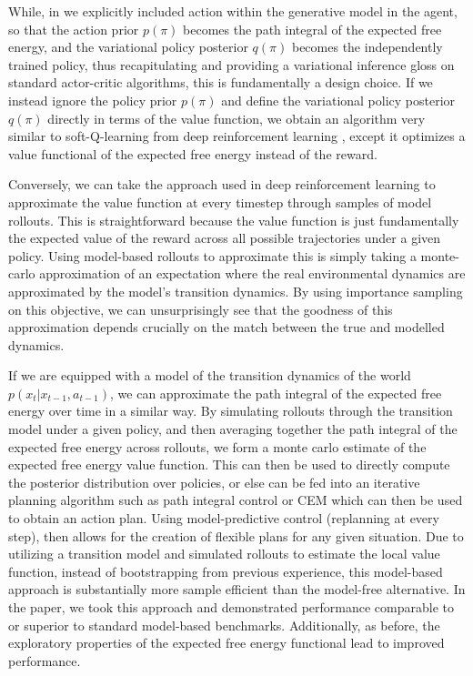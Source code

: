 While, in \citet{millidge_deep_2019} we explicitly included action within the generative model in the agent, so that the action prior $p(\pi)$ becomes the path integral of the expected free energy, and the variational policy posterior $q(\pi)$ becomes the independently trained policy, thus recapitulating and providing a variational inference gloss on standard actor-critic algorithms, this is fundamentally a design choice. If we instead ignore the policy prior $p(\pi)$ and define the variational policy posterior $q(\pi)$ directly in terms of the value function, we obtain an algorithm very similar to soft-Q-learning from deep reinforcement learning \citep{haarnoja2018soft}, except it optimizes a value functional of the expected free energy instead of the reward.

Conversely, we can take the approach used in deep reinforcement learning to approximate the value function at every timestep through samples of model rollouts. This is straightforward because the value function is just fundamentally the expected value of the reward across all possible trajectories under a given policy. Using model-based rollouts to approximate this is simply taking a monte-carlo approximation of an expectation where the real environmental dynamics are approximated by the model's transition dynamics. By using importance sampling on this objective, we can unsurprisingly see that the goodness of this approximation depends crucially on the match between the true and modelled dynamics.

If we are equipped with a model of the transition dynamics of the world $p(x_t | x_{t-1}, a_{t-1})$, we can approximate the path integral of the expected free energy over time in a similar way. By simulating rollouts through the transition model under a given policy, and then averaging together the path integral of the expected free energy across rollouts, we form a monte carlo estimate of the expected free energy value function. This can then be used to directly compute the posterior distribution over policies, or else can be fed into an iterative planning algorithm such as path integral control or CEM which can then be used to obtain an action plan. Using model-predictive control (replanning at every step), then allows for the creation of flexible plans for any given situation. Due to utilizing a transition model and simulated rollouts to estimate the local value function, instead of bootstrapping from previous experience, this model-based approach is substantially more sample efficient than the model-free alternative. In the \citet{tschantz2020reinforcement} paper, we took this approach and demonstrated performance comparable to or superior to standard model-based benchmarks. Additionally, as before, the exploratory properties of the expected free energy functional lead to improved performance.

